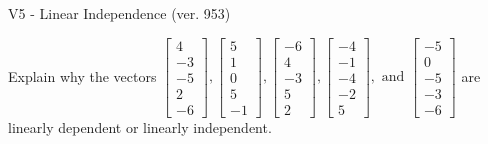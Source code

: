 \begin{exercise}
  \begin{exerciseTitle}V5 - Linear Independence (ver. 953)\end{exerciseTitle}
  \begin{exerciseStatement}
    Explain why the vectors \(\left[\begin{array}{r}
4 \\
-3 \\
-5 \\
2 \\
-6
\end{array}\right] , \left[\begin{array}{r}
5 \\
1 \\
0 \\
5 \\
-1
\end{array}\right] , \left[\begin{array}{r}
-6 \\
4 \\
-3 \\
5 \\
2
\end{array}\right] , \left[\begin{array}{r}
-4 \\
-1 \\
-4 \\
-2 \\
5
\end{array}\right] , \text{ and } \left[\begin{array}{r}
-5 \\
0 \\
-5 \\
-3 \\
-6
\end{array}\right]\) are linearly dependent or linearly independent.	



\end{exerciseStatement}
\end{exercise}

